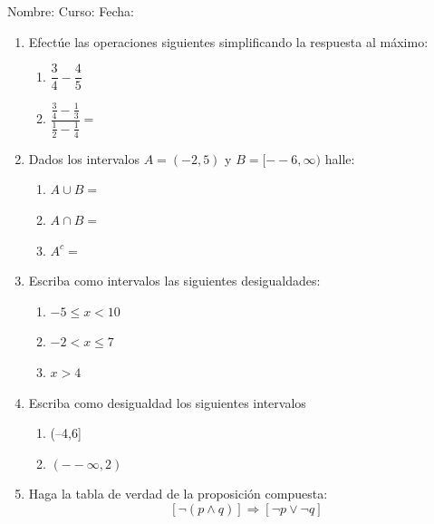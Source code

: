 \documentclass[letterpaper,fleqn]{article}
\newcommand{\LineaNombre}{%
\par
\vspace{\baselineskip}
Nombre:\hrulefill \; Curso: \underline{\hspace*{48pt}} \; Fecha: \underline{\hspace*{2.5cm}} \relax
\par}
\begin{document}
\LineaNombre
\begin{enumerate}
 \item Efectúe las operaciones siguientes simplificando la respuesta al máximo:
 \begin{enumerate}
 \item $\dfrac{3}{4}-\dfrac{4}{5}$\noanswer
 \item $\dfrac{\frac{3}{4}-\frac{1}{3}}{\frac{1}{2}-\frac{1}{4}}=$\noanswer
 \end{enumerate}
\item Dados los intervalos $A=(-2,5)$ y $B=[--6,\infty)$ halle:
\begin{enumerate}
\item $A\cup B=$
\item $A \cap B=$
\item $A^{c}=$
\end{enumerate}
\item Escriba como intervalos las siguientes desigualdades:
\begin{enumerate}
\item $-5\leq x<10$
\item $-2<x \leq7$
\item $x>4$
\end{enumerate}
\item Escriba como desigualdad los siguientes intervalos
\begin{enumerate}
\item (--4,6]
\item $(--\infty,2)$
\end{enumerate}
\item Haga la tabla de verdad de la proposición compuesta:
\[[\neg(p\wedge q)]\Rightarrow [\neg p \vee \neg q]\]

 \end{enumerate}
\end{document}
